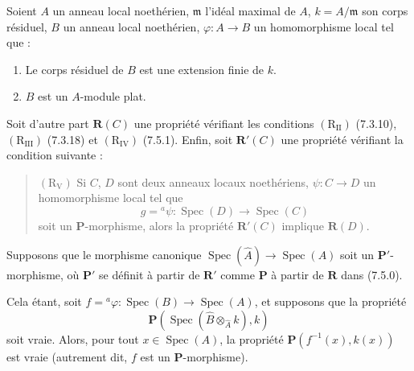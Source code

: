 \begin{corollary}[7.5.2]
\label{IV.2.s7.5.2-fr}
Soient $A$ un anneau local noethérien, $\mathfrak m$ l'idéal maximal de $A$,
$k=A/\mathfrak m$ son corps résiduel, $B$ un anneau local noethérien,
$\varphi:A\to B$ un homomorphisme local tel que :
\begin{enumerate}
\item[\emph{(i)}] Le corps résiduel de $B$ est une extension finie de $k$.
\item[\emph{(ii)}] $B$ est un $A$-module plat.
\end{enumerate}
Soit d'autre part $\boldsymbol R(C)$ une propriété vérifiant les conditions
$(\mathrm R_{\mathrm{II}})$ (7.3.10), $(\mathrm R_{\mathrm{III}})$
(7.3.18) et $(\mathrm R_{\mathrm{IV}})$ (7.5.1). Enfin, soit
$\boldsymbol R'(C)$ une propriété vérifiant la condition suivante :
\begin{quote}
$(\mathrm R_{\mathrm V})$ Si $C$, $D$ sont deux anneaux locaux noethériens,
$\psi:C\to D$ un homomorphisme local tel que
\[
g={}^a\psi:\operatorname{Spec}(D)\to\operatorname{Spec}(C)
\]
soit un $\boldsymbol P$-morphisme, alors la propriété
$\boldsymbol R'(C)$ implique $\boldsymbol R(D)$.
\end{quote}
Supposons que le morphisme canonique
$\operatorname{Spec}(\widehat A)\to\operatorname{Spec}(A)$ soit un
$\boldsymbol P'$-morphisme, où $\boldsymbol P'$ se définit à partir de
$\boldsymbol R'$ comme $\boldsymbol P$ à partir de $\boldsymbol R$ dans
(7.5.0).

Cela étant, soit
$f={}^a\varphi:\operatorname{Spec}(B)\to\operatorname{Spec}(A)$, et
supposons que la propriété
\[
\boldsymbol P(\operatorname{Spec}(\widehat B
\otimes_{\widehat A}k),k)
\]
soit vraie. Alors, pour tout $x\in\operatorname{Spec}(A)$, la propriété
$\boldsymbol P(f^{-1}(x),k(x))$ est vraie (autrement dit, $f$ est un
$\boldsymbol P$-morphisme).
\end{corollary}

